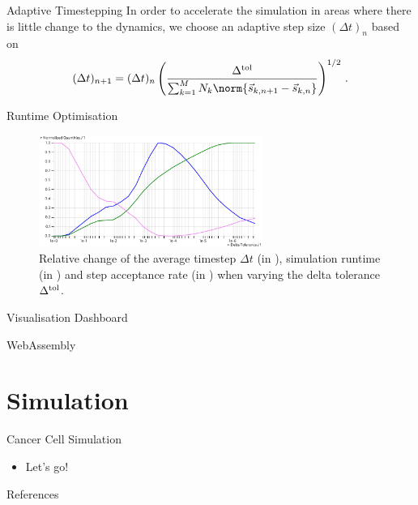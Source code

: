 \documentclass[aspectratio=169, hyperref={colorlinks=true}]{beamer}
\begin{document}
  \begin{frame}{Adaptive Timestepping}
    In order to accelerate the simulation in areas where there is little change to the dynamics, we choose an adaptive step size $(\Delta t)_{n}$ based on
    \begin{equation*}
      (\Delta t)_{n+1} = (\Delta t)_{n} \left(\frac{\Delta^{\rm tol}}{\sum_{k=1}^{M} N_k \norm{\vec{s}_{k,n+1} - \vec{s}_{k,n}}}\right)^{1/2}\,.
      \label{eq:dt-heuristic}
    \end{equation*}
  \end{frame}

  \begin{frame}{Runtime Optimisation}
    \begin{figure}
      \includegraphics[width=0.65\textwidth]{../../figures/results/delta-tolerance.pdf}
      \caption{
        Relative change of the average timestep $\Delta t$ (in ), simulation runtime (in ) and step acceptance rate (in ) when varying the delta tolerance $\Delta^{\rm tol}$.
      }
    \end{figure}
  \end{frame}

  \begin{frame}{Visualisation Dashboard}

  \end{frame}
  \begin{frame}{WebAssembly}
  \end{frame}

  \section{Simulation}
  \begin{frame}{Cancer Cell Simulation}
    \begin{itemize}
      \item Let's go!
    \end{itemize}
  \end{frame}

  \begin{frame}[allowframebreaks]{References}
    \printbibliography
  \end{frame}
\end{document}
